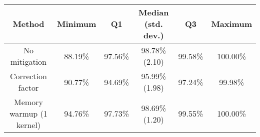 \begin{tabular}{|c|c|c|c|c|c|}
    \hline
        \textbf{Method} & \textbf{Minimum} & \textbf{Q1} & \textbf{Median (std. dev.)} & \textbf{Q3} & \textbf{Maximum} \\
    \hline
    \hline
        No mitigation & 88.19\% & 97.56\% & 98.78\% (2.10) & 99.58\% & 100.00\% \\
        Correction factor & 90.77\% & 94.69\% & 95.99\% (1.98) & 97.24\% & 99.98\% \\
        Memory warmup (1 kernel) & 94.76\% & 97.73\% & 98.69\% (1.20) & 99.55\% & 100.00\% \\
    \hline
\end{tabular}
